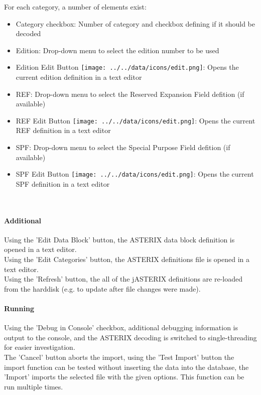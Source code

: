 For each category, a number of elements exist:

\begin{itemize}
\item Category checkbox: Number of category and checkbox defining if it should be decoded
\item Edition: Drop-down menu to select the edition number to be used
\item Edition Edit Button \texttt{[image: ../../data/icons/edit.png]}: Opens the current edition definition in a text editor
\item REF: Drop-down menu to select the Reserved Expansion Field defition (if available)
\item REF Edit Button \texttt{[image: ../../data/icons/edit.png]}: Opens the current REF definition in a text editor
\item SPF: Drop-down menu to select the Special Purpose Field defition (if available)
\item SPF Edit Button \texttt{[image: ../../data/icons/edit.png]}: Opens the current SPF definition in a text editor
\end{itemize}
\ \\

\paragraph{Additional}

Using the 'Edit Data Block' button, the ASTERIX data block definition is opened in a text editor. \\

Using the 'Edit Categories' button, the ASTERIX definitions file is opened in a text editor. \\

Using the 'Refresh' button, the all of the jASTERIX definitions are re-loaded from the harddisk (e.g. to update after file changes were made). \\



\paragraph{Running}
Using the 'Debug in Console' checkbox, additional debugging information is output to the console, and the ASTERIX decoding is switched to single-threading for easier investigation. \\

The 'Cancel' button aborts the import, using the 'Test Import' button the import function can be tested without inserting the data into the database, the 'Import' imports the selected file with the given options. This function can be run multiple times. \\


